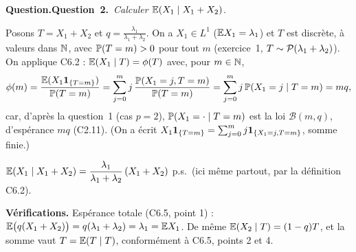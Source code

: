 \documentclass[11pt,a4paper]{article}
\newcommand{\question}[2]{\par\medskip\noindent\textbf{\ifx\relax#1\relax Question.\else Question~#1.\fi}~\textit{#2}\par\smallskip}
\newcommand{\Bin}{\mathcal{B}}
\begin{document}
\begin{exo}
\question{2}{Calculer $\mathbb{E}(X_1\mid X_1+X_2)$.}

Posons $T=X_1+X_2$ et $q=\frac{\lambda_1}{\lambda_1+\lambda_2}$. On a $X_1\in L^1$ ($\mathbb{E} X_1=\lambda_1$) et $T$ est discrète, à valeurs dans $\mathbb{N}$,
avec $\mathbb{P}(T=m)>0$ pour tout $m$ (exercice~1, $T\sim\mathcal{P}(\lambda_1+\lambda_2)$). On applique C6.2 :
$\mathbb{E}(X_1\mid T)=\phi(T)$ avec, pour $m\in\mathbb{N}$,
\[\phi(m)=\frac{\mathbb{E}(X_1\mathbf{1}_{\{T=m\}})}{\mathbb{P}(T=m)}=\sum_{j=0}^m j\,\frac{\mathbb{P}(X_1=j,T=m)}{\mathbb{P}(T=m)}=\sum_{j=0}^mj\,\mathbb{P}(X_1=j\mid T=m)=mq,\]
car, d'après la question~1 (cas $p=2$), $\mathbb{P}(X_1=\cdot\mid T=m)$ est la loi $\Bin(m,q)$, d'espérance $mq$ (C2.11).
(On a écrit $X_1\mathbf{1}_{\{T=m\}}=\sum_{j=0}^mj\mathbf{1}_{\{X_1=j,T=m\}}$, somme finie.)

\begin{resultat}
$\displaystyle\mathbb{E}(X_1\mid X_1+X_2)=\frac{\lambda_1}{\lambda_1+\lambda_2}\,(X_1+X_2)$ \quad p.s.\ (ici même partout, par la définition C6.2).
\end{resultat}

\textbf{Vérifications.} Espérance totale (C6.5, point 1) : $\mathbb{E}\bigl(q(X_1+X_2)\bigr)=q(\lambda_1+\lambda_2)=\lambda_1=\mathbb{E} X_1$.
De même $\mathbb{E}(X_2\mid T)=(1-q)T$, et la somme vaut $T=\mathbb{E}(T\mid T)$, conformément à C6.5, points 2 et 4.
\end{exo}
\end{document}

